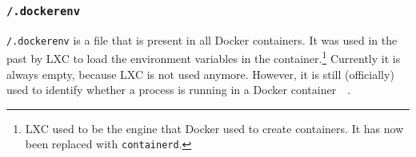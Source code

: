 \subsubsection{\texorpdfstring{\lstinline{/.dockerenv}}{/.dockerenv}}\label{subsubsection:dockerenv}
\lstinline{/.dockerenv} is a file that is present in all Docker containers. It was used in the past by LXC to load the environment variables in the container.\footnote{LXC used to be the engine that Docker used to create containers. It has now been replaced with \lstinline{containerd}.} Currently it is always empty, because LXC is not used anymore. However, it is still (officially) used to identify whether a process is running in a Docker container~\cite{Metasploit-Linux-Gather-Container-Detection}~\cite{Removed-Dockerinit-Reference}.
